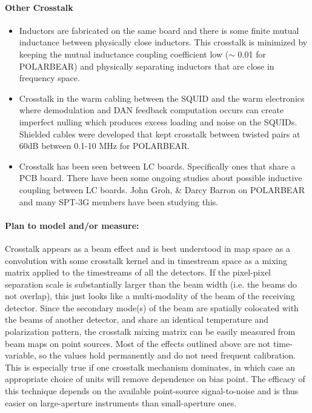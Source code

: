 \paragraph{Other Crosstalk}
\begin{itemize}

\item Inductors are fabricated on the same board and there is some finite mutual inductance between physically close inductors. This crosstalk is minimized by keeping the mutual inductance coupling coefficient low ($\sim$ 0.01 for POLARBEAR) and physically separating inductors that are close in frequency space. 
\item Crosstalk in the warm cabling between the SQUID and the warm electronics where demodulation and DAN feedback computation occurs can create imperfect nulling which produces excess loading and noise on the SQUIDs. Shielded cables were developed that kept crosstalk between twisted pairs at 60dB between 0.1-10 MHz for POLARBEAR. \cite{DfMux_Warm_Crosstalk_Memo}
\item Crosstalk has been seen between LC boards. Specifically ones that share a PCB board. There have been some ongoing studies about possible inductive coupling between LC boards. John Groh, \& Darcy Barron on POLARBEAR and many SPT-3G members have been studying this.
\end{itemize}

\paragraph{Plan to model and/or measure:}

Crosstalk appears as a beam effect and is best understood in map space as a convolution with some crosstalk kernel and in timestream space as a mixing matrix applied to the timestreams of all the detectors.
If the pixel-pixel separation scale is substantially larger than the beam width (i.e. the beams do not overlap), this just looks like a multi-modality of the beam of the receiving detector.
Since the secondary mode(s) of the beam are spatially colocated with the beams of another detector, and share an identical temperature and polarization pattern, the crosstalk mixing matrix can be easily measured from beam maps on point sources.
Most of the effects outlined above are not time-variable, so the values hold permanently and do not need frequent calibration.
This is especially true if one crosstalk mechanism dominates, in which case an appropriate choice of units will remove dependence on bias point.
The efficacy of this technique depends on the available point-source signal-to-noise and is thus easier on large-aperture instruments than small-aperture ones.

